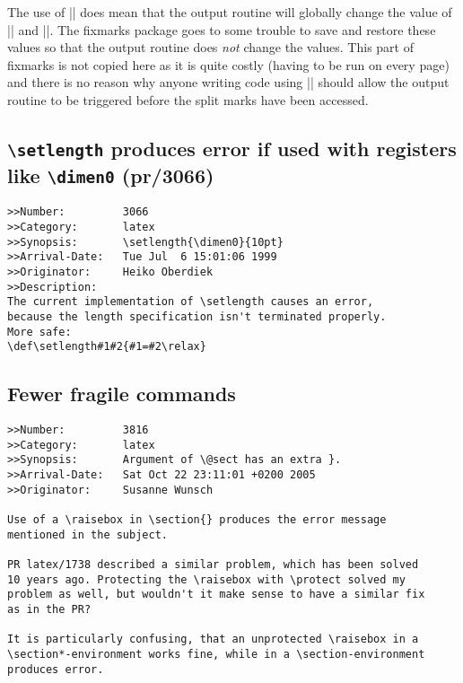 \documentclass{ltxguide}
\newcommand\Lpack[1]{\mbox{\textsf{#1}}}
\begin{document}
The use of |\vsplit| does mean that the output routine will globally
change the value of |\splitfirstmark| and
|\splitbotmark|. The \Lpack{fixmarks} package goes to some trouble
to save and restore these values so that the output routine does
\emph{not} change the values. This part of \Lpack{fixmarks} is not
copied here as it is quite costly (having to be run on every page) and
there is no reason why anyone writing code using |\vsplit| should
allow the output routine to be triggered before the split marks have
been accessed.



\subsection{\texttt{\textbackslash setlength} produces error if
  used with registers like \texttt{\textbackslash dimen0} (pr/3066)}

\begin{verbatim}
>>Number:         3066
>>Category:       latex
>>Synopsis:       \setlength{\dimen0}{10pt}
>>Arrival-Date:   Tue Jul  6 15:01:06 1999
>>Originator:     Heiko Oberdiek
>>Description:
The current implementation of \setlength causes an error,
because the length specification isn't terminated properly.
More safe:
\def\setlength#1#2{#1=#2\relax}
\end{verbatim}

\subsection{Fewer fragile commands}

\begin{verbatim}
>>Number:         3816
>>Category:       latex
>>Synopsis:       Argument of \@sect has an extra }.
>>Arrival-Date:   Sat Oct 22 23:11:01 +0200 2005
>>Originator:     Susanne Wunsch

Use of a \raisebox in \section{} produces the error message
mentioned in the subject.

PR latex/1738 described a similar problem, which has been solved
10 years ago. Protecting the \raisebox with \protect solved my
problem as well, but wouldn't it make sense to have a similar fix
as in the PR?

It is particularly confusing, that an unprotected \raisebox in a
\section*-environment works fine, while in a \section-environment
produces error.
\end{verbatim}
\end{document}
